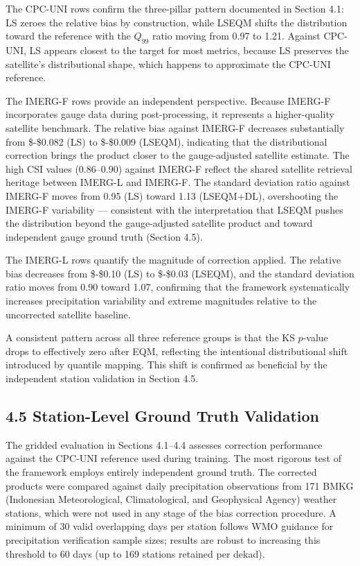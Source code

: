\documentclass[
]{article}
\begin{document}
The CPC-UNI rows confirm the three-pillar pattern documented in Section
4.1: LS zeroes the relative bias by construction, while LSEQM shifts the
distribution toward the reference with the \(Q_{99}\) ratio moving from
0.97 to 1.21. Against CPC-UNI, LS appears closest to the target for most
metrics, because LS preserves the satellite's distributional shape,
which happens to approximate the CPC-UNI reference.

The IMERG-F rows provide an independent perspective. Because IMERG-F
incorporates gauge data during post-processing, it represents a
higher-quality satellite benchmark. The relative bias against IMERG-F
decreases substantially from \$-\$0.082 (LS) to \$-\$0.009 (LSEQM),
indicating that the distributional correction brings the product closer
to the gauge-adjusted satellite estimate. The high CSI values
(0.86--0.90) against IMERG-F reflect the shared satellite retrieval
heritage between IMERG-L and IMERG-F. The standard deviation ratio
against IMERG-F moves from 0.95 (LS) toward 1.13 (LSEQM+DL),
overshooting the IMERG-F variability --- consistent with the
interpretation that LSEQM pushes the distribution beyond the
gauge-adjusted satellite product and toward independent gauge ground
truth (Section 4.5).

The IMERG-L rows quantify the magnitude of correction applied. The
relative bias decreases from \$-\$0.10 (LS) to \$-\$0.03 (LSEQM), and
the standard deviation ratio moves from 0.90 toward 1.07, confirming
that the framework systematically increases precipitation variability
and extreme magnitudes relative to the uncorrected satellite baseline.

A consistent pattern across all three reference groups is that the KS
\(p\)-value drops to effectively zero after EQM, reflecting the
intentional distributional shift introduced by quantile mapping. This
shift is confirmed as beneficial by the independent station validation
in Section 4.5.

\subsection{4.5 Station-Level Ground Truth
Validation}\label{station-level-ground-truth-validation}

The gridded evaluation in Sections 4.1--4.4 assesses correction
performance against the CPC-UNI reference used during training. The most
rigorous test of the framework employs entirely independent ground
truth. The corrected products were compared against daily precipitation
observations from 171 BMKG (Indonesian Meteorological, Climatological,
and Geophysical Agency) weather stations, which were not used in any
stage of the bias correction procedure. A minimum of 30 valid
overlapping days per station follows WMO guidance for precipitation
verification sample sizes; results are robust to increasing this
threshold to 60 days (up to 169 stations retained per dekad).
\end{document}
